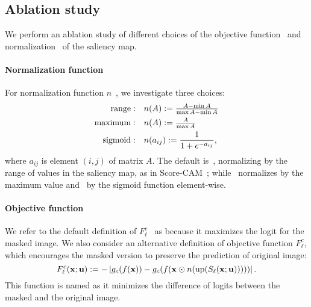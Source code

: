 \subsection{Ablation study}
\label{sec:ablation}

We perform an ablation study of different choices of the objective function~ and normalization~ of the saliency map. 


\paragraph{Normalization function}

For normalization function $n$~, we investigate three choices:
\begin{align}
	\textrm{range}   : \quad & n(A) \mathrel{:=} \textstyle \frac{A - \min A}{\max A - \min A}  \label{eq:n-rng}  \\
	\textrm{maximum} : \quad & n(A) \mathrel{:=} \textstyle \frac{A}{\max A}                    \label{eq:n-max}
	 \\
 	\textrm{sigmoid} : \quad & n(a_{ij}) \mathrel{:=} \frac{1}{1+e^{-a_{ij}}}             \label{eq:n-sig},
\end{align}
where $a_{ij}$ is element $(i,j)$ of matrix $A$. The default is~, normalizing by the range of values in the saliency map, as in Score-CAM~; while~ normalizes by the maximum value and~ by the sigmoid function element-wise.


\paragraph{Objective function}

We refer to the default definition of $F^c_\ell$~ as \Fdef because it maximizes the logit for the masked image.
We also consider an alternative definition of objective function $F^c_\ell$, which encourages the masked version to preserve the prediction of original image:
\begin{equation}
	F^c_\ell(\mathbf{x}; \mathbf{u}) \mathrel{:=} -\left|{g_c(f(\mathbf{x})) - g_c(f(\mathbf{x} \odot n(\operatorname{up}(S_\ell(\mathbf{x}; \mathbf{u})))))}\right|.
\label{eq:ref}
\end{equation}
This function is named \Fref as it minimizes the difference of logits between the masked and the original image.

